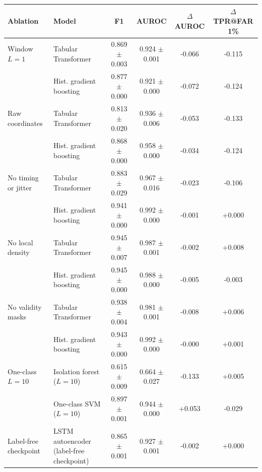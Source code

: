 \begin{tabular}{llcccc}
\toprule
Ablation & Model & F1 & AUROC & $\Delta$AUROC & $\Delta$TPR@FAR 1\% \\
\midrule
Window $L=1$ & Tabular Transformer & 0.869 $\pm$ 0.003 & 0.924 $\pm$ 0.001 & -0.066 & -0.115 \\
 & Hist. gradient boosting & 0.877 $\pm$ 0.000 & 0.921 $\pm$ 0.000 & -0.072 & -0.124 \\
\midrule
Raw coordinates & Tabular Transformer & 0.813 $\pm$ 0.020 & 0.936 $\pm$ 0.006 & -0.053 & -0.133 \\
 & Hist. gradient boosting & 0.868 $\pm$ 0.000 & 0.958 $\pm$ 0.000 & -0.034 & -0.124 \\
\midrule
No timing or jitter & Tabular Transformer & 0.883 $\pm$ 0.029 & 0.967 $\pm$ 0.016 & -0.023 & -0.106 \\
 & Hist. gradient boosting & 0.941 $\pm$ 0.000 & 0.992 $\pm$ 0.000 & -0.001 & +0.000 \\
\midrule
No local density & Tabular Transformer & 0.945 $\pm$ 0.007 & 0.987 $\pm$ 0.001 & -0.002 & +0.008 \\
 & Hist. gradient boosting & 0.945 $\pm$ 0.000 & 0.988 $\pm$ 0.000 & -0.005 & -0.003 \\
\midrule
No validity masks & Tabular Transformer & 0.938 $\pm$ 0.004 & 0.981 $\pm$ 0.001 & -0.008 & +0.006 \\
 & Hist. gradient boosting & 0.943 $\pm$ 0.000 & 0.992 $\pm$ 0.000 & -0.000 & +0.001 \\
\midrule
One-class $L=10$ & Isolation forest ($L=10$) & 0.615 $\pm$ 0.009 & 0.664 $\pm$ 0.027 & -0.133 & +0.005 \\
 & One-class SVM ($L=10$) & 0.897 $\pm$ 0.001 & 0.944 $\pm$ 0.000 & +0.053 & -0.029 \\
\midrule
Label-free checkpoint & LSTM autoencoder (label-free checkpoint) & 0.865 $\pm$ 0.001 & 0.927 $\pm$ 0.001 & -0.002 & +0.000 \\
\bottomrule
\end{tabular}
